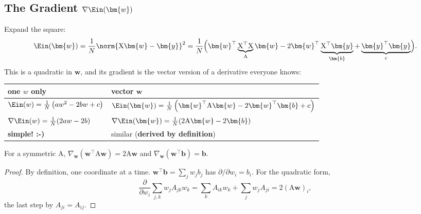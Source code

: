 \subsection{The Gradient \texorpdfstring{\(\nabla \Ein(\bm{w})\)}{of Ein}}

Expand the square:
\[
    \Ein(\bm{w}) = \frac{1}{N} \norm{\mathrm{X} \bm{w} - \bm{y}}^2
    = \frac{1}{N} \Bigl( \bm{w}^\top \underbrace{\mathrm{X}^\top
    \mathrm{X}}_{\mathrm{A}} \bm{w} - 2 \bm{w}^\top
    \underbrace{\mathrm{X}^\top \bm{y}}_{\bm{b}} +
    \underbrace{\bm{y}^\top \bm{y}}_{c} \Bigr) .
\]
This is a quadratic in \(\bm{w}\), and its gradient is the vector version of a
derivative everyone knows:

\begin{center}
    \solidrules
    \begin{tabular}{@{}l|l@{}}
        \toprule
        one \(w\) only & vector \(\bm{w}\)\\
        \midrule
        \(\Ein(w) = \frac{1}{N} \left( a w^2 - 2 b w + c \right)\)
        & \(\Ein(\bm{w}) = \frac{1}{N} \left( \bm{w}^\top \mathrm{A} \bm{w} - 2
        \bm{w}^\top \bm{b} + c \right)\)\\
        \(\nabla \Ein(w) = \frac{1}{N} (2 a w - 2 b)\)
        & \(\nabla \Ein(\bm{w}) = \frac{1}{N} (2 \mathrm{A} \bm{w} - 2
        \bm{b})\)\\
        \textcolor{orange!85!black}{\textbf{simple! :-)}}
        & similar (\textcolor{orange!85!black}{\textbf{derived by
        definition}})\\
        \bottomrule
    \end{tabular}
\end{center}

\begin{lemma}\label{lem:quad-grad}
    For a symmetric \(\mathrm{A}\), \(\nabla_{\bm{w}} (\bm{w}^\top
    \mathrm{A} \bm{w}) = 2 \mathrm{A} \bm{w}\) and \(\nabla_{\bm{w}}
    (\bm{w}^\top \bm{b}) = \bm{b}\).
\end{lemma}

\begin{proof}
    By definition, one coordinate at a time. \(\bm{w}^\top \bm{b} = \sum_j w_j
    b_j\) has \(\partial / \partial w_i = b_i\). For the quadratic form,
    \[
        \frac{\partial}{\partial w_i} \sum_{j,k} w_j A_{jk} w_k
        = \sum_k A_{ik} w_k + \sum_j w_j A_{ji}
        = 2 (\mathrm{A} \bm{w})_i ,
    \]
    the last step by \(A_{ji} = A_{ij}\).
\end{proof}

